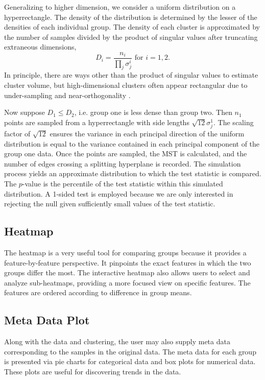 \documentclass{article}
\begin{document}
{Generalizing to higher dimension, we consider a uniform distribution on a hyperrectangle. The density of the distribution is determined by the lesser of the densities of each individual group. The density of each cluster is approximated by the number of samples divided by the product of singular values after truncating extraneous dimensions, $$D_i = \frac{n_i}{\prod_j \sigma_j^i} \textrm{ for } i=1,2.$$ In principle, there are ways other than the product of singular values to estimate cluster volume, but high-dimensional clusters often appear rectangular due to under-sampling and near-orthogonality \cite{near-orthogonal}.

Now suppose $D_1 \leq D_2$, i.e. group one is less dense than group two. Then $n_1$ points are sampled from a hyperrectangle with side lengths $\sqrt{12}\sigma_j^{1}$. The scaling factor of $\sqrt{12}$ ensures the variance in each principal direction of the uniform distribution is equal to the variance contained in each principal component of the group one data. Once the points are sampled, the MST is calculated, and the number of edges crossing a splitting hyperplane is recorded. The simulation process yields an approximate distribution to which the test statistic is compared. The $p$-value is the percentile of the test statistic within this simulated distribution. A 1-sided test is employed because we are only interested in rejecting the null given sufficiently small values of the test statistic.

\subsection{Heatmap}
The heatmap is a very useful tool for comparing groups because it provides a feature-by-feature perspective. It pinpoints the exact features in which the two groups differ the most. The interactive heatmap also allows users to select and analyze sub-heatmaps, providing a more focused view on specific features. The features are ordered according to difference in group means.

\subsection{Meta Data Plot}
Along with the data and clustering, the user may also supply meta data corresponding to the samples in the original data. The meta data for each group is presented via pie charts for categorical data and box plots for numerical data. These plots are useful for discovering trends in the data.

}
\end{document}
